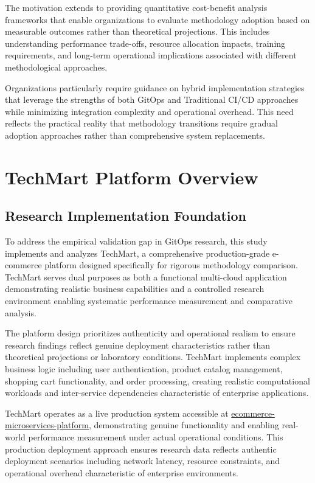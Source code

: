The motivation extends to providing quantitative cost-benefit analysis frameworks that enable organizations to evaluate methodology adoption based on measurable outcomes rather than theoretical projections. This includes understanding performance trade-offs, resource allocation impacts, training requirements, and long-term operational implications associated with different methodological approaches.

Organizations particularly require guidance on hybrid implementation strategies that leverage the strengths of both GitOps and Traditional CI/CD approaches while minimizing integration complexity and operational overhead. This need reflects the practical reality that methodology transitions require gradual adoption approaches rather than comprehensive system replacements.

\section{TechMart Platform Overview}

\subsection{Research Implementation Foundation}
To address the empirical validation gap in GitOps research, this study implements and analyzes TechMart, a comprehensive production-grade e-commerce platform designed specifically for rigorous methodology comparison. TechMart serves dual purposes as both a functional multi-cloud application demonstrating realistic business capabilities and a controlled research environment enabling systematic performance measurement and comparative analysis.

The platform design prioritizes authenticity and operational realism to ensure research findings reflect genuine deployment characteristics rather than theoretical projections or laboratory conditions. TechMart implements complex business logic including user authentication, product catalog management, shopping cart functionality, and order processing, creating realistic computational workloads and inter-service dependencies characteristic of enterprise applications.

TechMart operates as a live production system accessible at \href{https://github.com/kousaila502/ecommerce-microservices-platform}{ecommerce-microservices-platform}, demonstrating genuine functionality and enabling real-world performance measurement under actual operational conditions. This production deployment approach ensures research data reflects authentic deployment scenarios including network latency, resource constraints, and operational overhead characteristic of enterprise environments.


